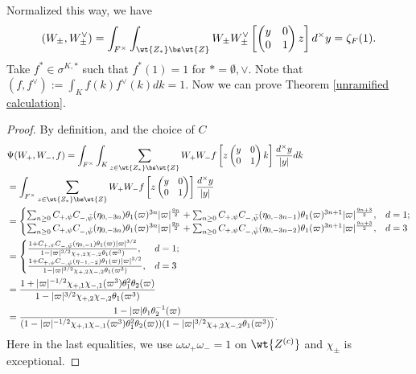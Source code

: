 \documentclass[11pt,reqno]{amsart}
\theoremstyle{plain}
\theoremstyle{remark} \newtheorem{remark}[thm]{Remark}
\theoremstyle{definition} \newtheorem{exercise}[thm]{Exercise}
\theoremstyle{definition} \newtheorem{example}[thm]{Example} \newtheorem{condition}[thm]{Condition}
\numberwithin{equation}{section}
\renewcommand{\-}{\text{--}}
\begin{document}
Normalized this way, we have \[(W_{\pm},W_\pm^\vee)=\int_{F^\times}\int_{\wt{Z_*}\bs\wt{Z}}W_\pm W_\pm^\vee\left[\begin{pmatrix}y & 0\\ 0 & 1\end{pmatrix}z\right]d^\times y=\zeta_F(1).\]
Take  $f^*\in\sigma^{K,*}$ such that $f^*(1)=1$ for $*=\emptyset, \vee$.  Note that $(f,f^\vee):=\int_Kf(k)f^\vee(k)dk=1$. Now we can prove Theorem \ref{unramified calculation}.
\begin{proof}
By definition, \cite[Theorem I.4.2]{KP84} and the choice of $C$ 
\begin{align*}
    &\Psi(W_+,W_-,f)=\int_{F^\times}\int_{K}\sum_{z\in \wt{Z_*}\bs \wt{Z}}W_+W_-f\left[z\begin{pmatrix}y & 0\\ 0 & 1\end{pmatrix}k\right]\frac{d^\times y}{|y|}dk\\
    &=\int_{F^\times}\sum_{z\in \wt{Z_*}\bs\wt{Z}}
    W_+W_-f\left[z\begin{pmatrix}y & 0\\ 0 & 1\end{pmatrix}\right]\frac{d^\times y}{|y|}\\
    &=\begin{cases}\sum_{n\geq0}C_{+,\psi}C_{-,\bar{\psi}}(\eta_{0,-3n})\theta_1(\varpi)^{3n} |\varpi|^{\frac{9n}{2}}+\sum_{n\geq0}C_{+,\psi}C_{-,\bar{\psi}}(\eta_{0,-3n-1})\theta_1(\varpi)^{3n+1} |\varpi|^{\frac{9n+3}{2}}, & d=1;\\
    \sum_{n\geq0}C_{+,\psi}C_{-,\bar{\psi}}(\eta_{0,-3n})\theta_1(\varpi)^{3n} |\varpi|^{\frac{9n}{2}}+\sum_{n\geq0}C_{+,\psi}C_{-,\bar{\psi}}(\eta_{0,-3n-2})\theta_1(\varpi)^{3n+1} |\varpi|^{\frac{9n+3}{2}}, & d=3
    \end{cases}\\
    &=\begin{cases}\frac{1+C_{+,\psi}C_{-,\bar{\psi}}(\eta_{0,-1})\theta_1(\varpi)|\varpi|^{3/2}}{1-|\varpi|^{3/2}\chi_{+,2}\chi_{-,2}\theta_1(\varpi^3)}, & d=1;\\
    \frac{1+C_{+,\psi}C_{-,\bar{\psi}}(\eta_{-1,-2})\theta_1(\varpi)|\varpi|^{3/2}}{1-|\varpi|^{3/2}\chi_{+,2}\chi_{-,2}\theta_1(\varpi^3)}, & d=3
    \end{cases}\\
&=\frac{1+|\varpi|^{-1/2}\chi_{+,1}\chi_{-,1}(\varpi^3)\theta_1^2\theta_2(\varpi)}{1-|\varpi|^{3/2}\chi_{+,2}\chi_{-,2}\theta_1(\varpi^3)}\\
&=\frac{1-|\varpi|\theta_1\theta_2^{-1}(\varpi)}{(1-|\varpi|^{-1/2}\chi_{+,1}\chi_{-,1}(\varpi^3)\theta_1^2\theta_2(\varpi))(1-|\varpi|^{3/2}\chi_{+,2}\chi_{-,2}\theta_1(\varpi^3))}.
\end{align*}
Here in the last equalities, we use  $\omega\omega_+\omega_-=1$ on $\wt{Z^{(c)}}$ and $\chi_{\pm}$ is exceptional. 


\end{proof}
\end{document}
